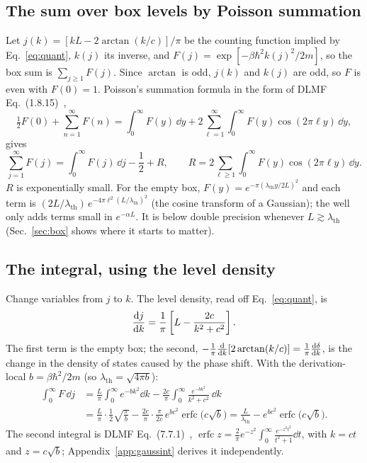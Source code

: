 \documentclass[11pt]{article}
\numberwithin{equation}{section}
\providecommand{\erfc}{\operatorname{erfc}}
\newcommand{\lth}{\lambda_{\mathrm{th}}}
\begin{document}
\subsection{The sum over box levels by Poisson summation}
\label{sec:poisson}
Let $j(k)=[kL-2\arctan(k/c)]/\pi$ be the counting function implied by Eq.~\eqref{eq:quant}, $k(j)$ its inverse, and $F(j)=\exp[-\beta\hbar^2k(j)^2/2m]$, so the box sum is $\sum_{j\ge1}F(j)$. Since $\arctan$ is odd, $j(k)$ and $k(j)$ are odd, so $F$ is even with $F(0)=1$. Poisson's summation formula in the form of DLMF Eq.~(1.8.15)~\cite{dlmf},
\[
\tfrac12F(0)+\sum_{n=1}^{\infty}F(n)=\int_0^\infty F(y)\,\dd y+2\sum_{\ell=1}^{\infty}\int_0^\infty F(y)\cos(2\pi\ell y)\,\dd y,
\]
gives
\begin{equation}
\sum_{j=1}^{\infty}F(j)=\int_0^\infty F(j)\,\dd j-\frac12+R,\qquad R=2\sum_{\ell\ge1}\int_0^\infty F(y)\cos(2\pi\ell y)\,\dd y.
\label{eq:poisson}
\end{equation}
$R$ is exponentially small. For the empty box, $F(y)=e^{-\pi(\lth y/2L)^2}$ and each term is $(2L/\lth)\,e^{-4\pi\ell^2(L/\lth)^2}$ (the cosine transform of a Gaussian); the well only adds terms small in $e^{-\alpha L}$. It is below double precision whenever $L\gtrsim\lth$ (Sec.~\ref{sec:box} shows where it starts to matter).

\subsection{The integral, using the level density}
Change variables from $j$ to $k$. The level density, read off Eq.~\eqref{eq:quant}, is
\begin{equation}
\dv{j}{k}=\frac1\pi\left[L-\frac{2c}{k^2+c^2}\right].
\end{equation}
The first term is the empty box; the second, $-\frac1\pi\dv{k}[2\arctan(k/c)]=\frac1\pi\dv{\delta}{k}$, is the change in the density of states caused by the phase shift. With the derivation-local $b=\beta\hbar^2/2m$ (so $\lth=\sqrt{4\pi b}$):
\begin{align}
\int_0^\infty F\,\dd j&=\frac{L}{\pi}\int_0^\infty e^{-bk^2}\dd k-\frac{2c}{\pi}\int_0^\infty\frac{e^{-bk^2}}{k^2+c^2}\,\dd k\nonumber\\
&=\frac{L}{\pi}\cdot\frac12\sqrt{\frac{\pi}{b}}-\frac{2c}{\pi}\cdot\frac{\pi}{2c}\,e^{bc^2}\erfc\!\big(c\sqrt b\big)
=\frac{L}{\lth}-e^{bc^2}\erfc\!\big(c\sqrt b\big).
\end{align}
The second integral is DLMF Eq.~(7.7.1)~\cite{dlmf}, $\erfc z=\frac{2}{\pi}e^{-z^2}\int_0^\infty\frac{e^{-z^2t^2}}{t^2+1}\dd t$, with $k=ct$ and $z=c\sqrt b$; Appendix~\ref{app:gaussint} derives it independently.
\end{document}
